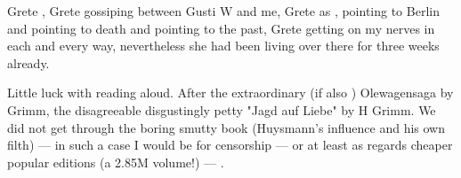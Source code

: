Grete , Grete gossiping between Gusti W and me, Grete as , pointing to Berlin and pointing to death and pointing to the past, Grete getting on my nerves in each and every way, nevertheless she had been living over there for three weeks already.

Little luck with reading aloud. After the extraordinary (if also ) Olewagensaga by Grimm, the disagreeable disgustingly petty "Jagd auf Liebe" by H Grimm. We did not get through the boring smutty book (Huysmann's influence and his own filth) — in such a case I would be for censorship — or at least as regards cheaper popular editions (a 2.85M volume!) — \missing.
